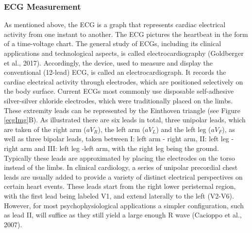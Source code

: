 
\subsubsection{ECG Measurement}

As mentioned above, the ECG is a graph that represents cardiac electrical activity from one instant to another. The ECG pictures the heartbeat in the form of a time-voltage chart. The general study of ECGs, including its clinical applications and technological aspects, is called electrocardiography (Goldberger et al., 2017). Accordingly, the device, used to measure and display the conventional (12-lead) ECG, is called an electrocardiograph. It records the cardiac electrical activity through electrodes, which are positioned selectively on the body surface. Current ECGs most commonly use disposable self-adhesive silver-silver chloride electrodes, which were traditionally placed on the limbs. These extremity leads can be represented by the Einthoven triangle (see Figure \ref{ecgImg}B). As illustrated there are six leads in total, three unipolar leads, which are taken of the right arm ($aV_{R}$), the left arm ($aV_{L}$) and the left leg ($aV_{F}$), as well as three bipolar leads, taken between I: left arm - right arm, II: left leg - right arm and III: left leg -left arm, with the right leg being the ground. Typically these leads are approximated by placing the electrodes on the torso instead of the limbs. In clinical cardiology, a series of unipolar precordial chest leads are usually added to provide a variety of distinct electrical perspectives on certain heart events. These leads start from the right lower peristernal region, with the first lead being labeled V1, and extend laterally to the left (V2-V6). However, for most psychophysiological applications a simpler configuration, such as lead II, will suffice as they still yield a large enough R wave (Cacioppo et al., 2007). 

